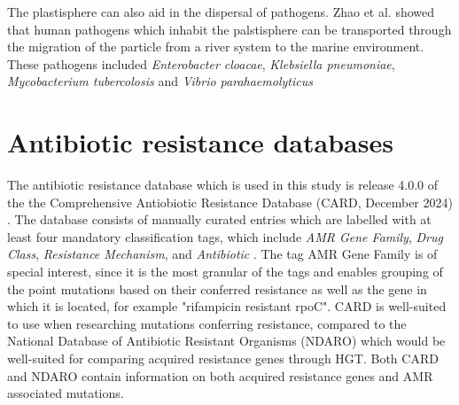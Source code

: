 The plastisphere can also aid in the dispersal of pathogens. Zhao et al. \cite{zhao2024ExploringDynamicsAntibiotic} showed that human pathogens which inhabit the palstisphere can be transported through the migration of the particle from a river system to the marine environment. These pathogens included \emph{Enterobacter cloacae}, \emph{Klebsiella pneumoniae}, \emph{Mycobacterium tubercolosis} and \emph{Vibrio parahaemolyticus}

\section{Antibiotic resistance databases}
The antibiotic resistance database which is used in this study is release 4.0.0 of the the Comprehensive Antiobiotic Resistance Database (CARD, December 2024) \cite{alcock2023CARD2023Expanded}.
The database consists of manually curated entries which are labelled with at least four mandatory classification tags, which include \emph{AMR Gene Family}, \emph{Drug Class}, \emph{Resistance Mechanism}, and \emph{Antibiotic} \cite{alcock2020CARD2020Antibiotic}. 
The tag AMR Gene Family is of special interest, since it is the most granular of the tags and enables grouping of the point mutations based on their conferred resistance as well as the gene in which it is located, for example "rifampicin resistant rpoC". 
CARD is well-suited to use when researching mutations conferring resistance, compared to the National Database of Antibiotic Resistant Organisms (NDARO) \cite{feldgarden2021AMRFinderPlusReferenceGene} which would be well-suited for comparing acquired resistance genes through HGT. Both CARD and NDARO contain information on both acquired resistance genes and AMR associated mutations. 



